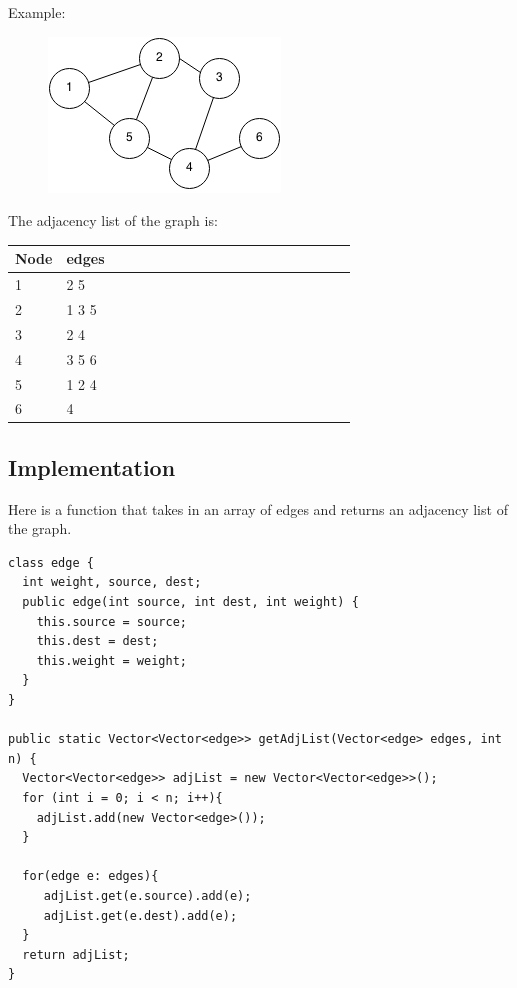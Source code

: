 \documentclass[11pt,oneside]{book}
\makeatletter
\def\maxwidth#1{\ifdim\Gin@nat@width>#1 #1\else\Gin@nat@width\fi}
\makeatother
\begin{document}
Example:

\vspace{5px}\begin{figure}[H]\centering
        \includegraphics[width=0.66\maxwidth{\textwidth}]{graph.png}
        \end{figure}

The adjacency list of the graph is:

\begin{center}\begin{tabulary}{0.4\linewidth}{|l|l|l|l|l|l|l|l|l|l|l|l|l|l|l|l|l|l|l}\hline


  Node &
  edges\\
\hline


  1 &
  2 5\\

  2 &
  1 3 5\\

  3 &
  2 4\\

  4 &
  3 5 6\\

  5 &
  1 2 4\\

  6 &
  4\\

\hline\end{tabulary}\end{center}

\subsection{Implementation}

Here is a function that takes in an array of edges and returns an adjacency list of the graph.

\begin{lstlisting}
class edge {
  int weight, source, dest;
  public edge(int source, int dest, int weight) {
    this.source = source;
    this.dest = dest;
    this.weight = weight;
  }
}

public static Vector<Vector<edge>> getAdjList(Vector<edge> edges, int n) {
  Vector<Vector<edge>> adjList = new Vector<Vector<edge>>();
  for (int i = 0; i < n; i++){
    adjList.add(new Vector<edge>());
  }
  
  for(edge e: edges){
     adjList.get(e.source).add(e);
     adjList.get(e.dest).add(e);
  }
  return adjList;
}
\end{lstlisting}
\end{document}
